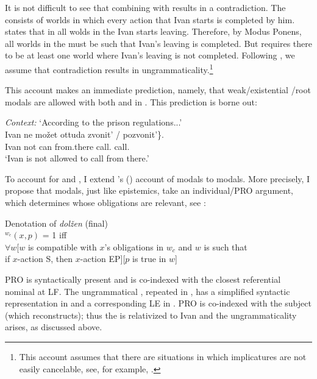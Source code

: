 \documentclass[output=paper,newtxmath,colorlinks,citecolor=brown]{langsci/langscibook}
\begin{document}
\noindent It is not difficult to see that combining  with  results in a contradiction. The  consists of worlds in which every action that Ivan starts is completed by him.  states that in all wolds in the  Ivan starts leaving. Therefore, by Modus Ponens, all worlds in the  must be such that Ivan's leaving is completed. But  requires there to be at least one world where Ivan's leaving is not completed. Following \citet{gaj02}, we assume that contradiction results in ungrammaticality.\footnote{This account assumes that there are situations in which implicatures are not easily cancelable,  see, for example, \cite{mag09,mag11}.
}

This account makes an immediate prediction, namely, that weak/existential /root modals are allowed with both \im and \p in . This prediction is borne out:

\ea \textit{Context:} `According to the prison regulations...' \\
    \gll Ivan ne mo\v zet ottuda \minsp{\{} zvonit' / pozvonit'\}. \\
	Ivan not can from.there {} {call.\im} {} {call.\p} {} \\
	\glt `Ivan is not allowed to call from there.' \label{existdeon}
	\z

\noindent To account for  and , I extend \citeauthor{ste07a}'s (\citeyear{ste07a}) account of  modals to  modals. More precisely, I propose that  modals, just like epistemics, take an individual/PRO argument, which determines whose obligations are relevant, see :

\ea Denotation of \textit{dolžen} (final) \\
	$^{w_c}(x,p)$ = 1 iff \\
    $\forall w$[$w$ is compatible with $x$'s obligations in $w_c$ and $w$ is such that \\
    if $x$-action S, then $x$-action EP][$p$ is true in $w$]  \label{sxdolzhenfinal}
        \z

\noindent PRO is syntactically present and is co-indexed with the closest referential nominal at LF. The ungrammatical , repeated in , has a simplified syntactic representation in  and a corresponding LE in . PRO is co-indexed with the subject (which reconstructs); thus the   is relativized to Ivan and the ungrammaticality arises, as discussed above.
\end{document}
